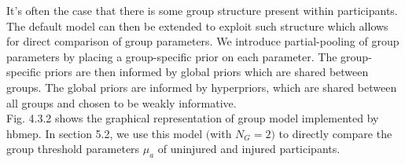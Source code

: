 \documentclass[a4paper,12pt]{article}
\begin{document}
It’s often the case that there is some group structure present within participants. The default model can then be extended to exploit such structure which allows for direct comparison of group parameters. We introduce partial-pooling of group parameters by placing a group-specific prior on each parameter. The group-specific priors are then informed by global priors which are shared between groups. The global priors are informed by hyperpriors, which are shared between all groups and chosen to be weakly informative. \\

Fig. 4.3.2 shows the graphical representation of group model implemented by hbmep. In section 5.2, we use this model $($with $N_G = 2$$)$ to directly compare the group threshold parameters $\mu_a$ of uninjured and injured participants.
\end{document}

